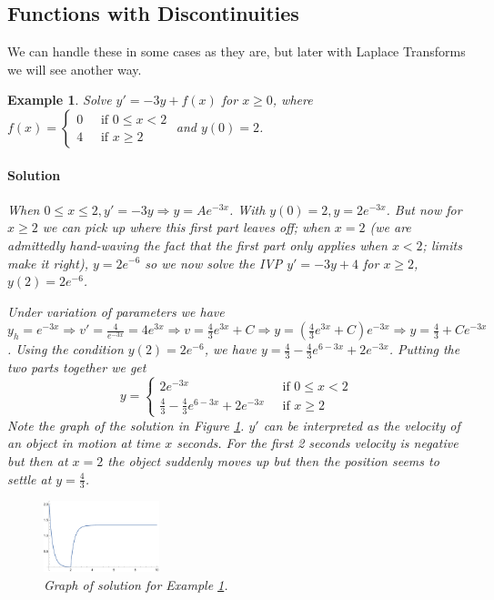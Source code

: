 \documentclass[letterpaper, 11pt, openany]{book}
\theoremstyle{mytheoremstyle}
\theoremstyle{myexamplestyle}
\newtheorem{example}{Example}[section]
\newenvironment{solution}{\paragraph{\sffamily \smaller \fontseries{b}\selectfont Solution}}{\hfill\faSquare}
\begin{document}
\subsection{Functions with Discontinuities}
We can handle these in some cases as they are, but later with Laplace Transforms we will see another way.

\begin{example}\label{e:de-discontinuous-linear}
    Solve \(y' = -3y + f(x)\) for \(x \geq 0\), where \(f(x) =
    \begin{cases}
        0 \; &\text{ if } 0 \leq x < 2\\
        4 \; &\text{ if } x \geq 2    
    \end{cases}\) and \(y(0) = 2\).
\begin{solution}
    When \(0 \leq x \leq 2, y' = -3y \Rightarrow y = Ae^{-3x}\). With \(y(0) = 2, y = 2e^{-3x}\). But now for \(x \geq 2\) we can pick up where this first part leaves off; when \(x = 2\) (we are admittedly hand-waving the fact that the first part only applies when \(x < 2\); limits make it right), \(y = 2e^{-6}\) so we now solve the IVP \(y' = -3y + 4\) for \(x \geq 2\), \(y(2) = 2e^{-6}\).

    Under variation of parameters we have \(y_{h} = e^{-3x} \Rightarrow v' = \frac{4}{e^{-3x}} = 4e^{3x} \Rightarrow v = \frac{4}{3}e^{3x} + C \Rightarrow y = \left(\frac{4}{3} e^{3x} + C\right) e^{-3x} \Rightarrow y = \frac{4}{3} + Ce^{-3x}\). Using the condition \(y(2) = 2e^{-6}\), we have \(y = \frac{4}{3} - \frac{4}{3}e^{6-3x} + 2e^{-3x}\). Putting the two parts together we get
    \[
        y = \begin{cases}
                2e^{-3x}\; &\text{ if } 0 \leq x < 2\\
                \frac{4}{3} - \frac{4}{3}e^{6-3x} + 2e^{-3x}\; &\text{ if } x \geq 2
            \end{cases}
    \]
    Note the graph of the solution in Figure \ref{f:de-discontinuous-linear}. \(y'\) can be interpreted as the velocity of an object in motion at time \(x\) seconds. For the first 2 seconds velocity is negative but then at \(x=2\) the object suddenly moves up but then the position seems to settle at \(y = \frac{4}{3}\).
\begin{figure}[htbp]
    \centering
        \includegraphics[width=0.3\textwidth]{Figures/de-discontinuous-linear.pdf}
    \caption{Graph of solution for Example \ref{e:de-discontinuous-linear}.}
    \label{f:de-discontinuous-linear}
\end{figure}
\end{solution}

\end{example}
\end{document}
